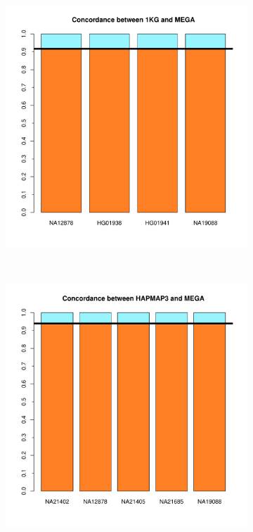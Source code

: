 \documentclass[11pt]{report}
\begin{document}
\begin{figure}[ht!]
    \centering
    \caption{Comparacion cluster GLOBAL}
    \begin{subfigure}[t]{0.5\textwidth}
        \centering
        \includegraphics[scale=0.55]{Concordance_1KG_MEGA_clusterGLOBAL.pdf}
    \end{subfigure}%
    ~ 
    \begin{subfigure}[t]{0.5\textwidth}
        \centering
        \includegraphics[scale=0.55]{Concordance_HAPMAP_MEGA_clusterGLOBAL.pdf}
    \end{subfigure}
\end{figure}

\end{document}
